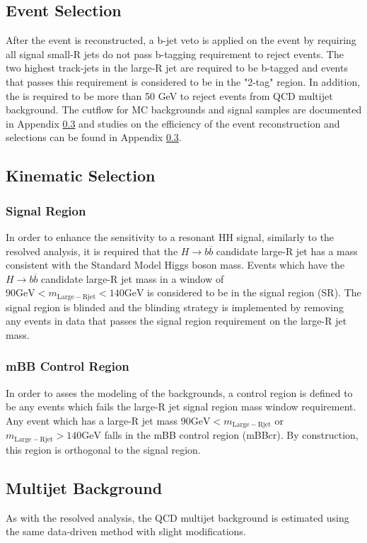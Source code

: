 \subsection{Event Selection}
After the event is reconstructed, a b-jet veto is applied on the event by requiring all signal small-R jets do not pass b-tagging requirement to reject \ttbar events. The two highest \pT track-jets in the large-R jet are required to be b-tagged and events that passes this requirement is considered to be in the "2-tag" region. In addition, the \met is required to be more than 50 GeV to reject events from QCD multijet background. The cutflow for MC backgrounds and signal samples are documented in Appendix \ref{} and studies on the efficiency of the event reconstruction and selections can be found in Appendix \ref{}.

\subsection{Kinematic Selection}
\subsubsection{Signal Region}
\label{sec:boosted_regiondefs}
In order to enhance the sensitivity to a resonant HH signal, similarly to the resolved analysis, it is required
that the ${H\rightarrow b\overline{b}}$ candidate large-R jet has a mass consistent with the Standard Model Higgs boson mass.
Events which have the ${H\rightarrow b\overline{b}}$ candidate large-R jet mass in a window of ${90 \mathrm{GeV} < m_{\mathrm{Large-R jet}} < 140 \mathrm{GeV}}$ is considered to be in the signal region (SR).
The signal region is blinded and the blinding strategy is implemented by removing any events in data that passes the signal region requirement on the large-R jet mass.

\subsubsection{mBB Control Region}
In order to asses the modeling of the backgrounds, a control region is defined to be any events which fails the large-R jet signal region mass window requirement. Any event which has a large-R jet mass
 ${90 \mathrm{GeV} < m_{\mathrm{Large-R jet}}}$
 or ${m_{\mathrm{Large-R jet}} > 140 \mathrm{GeV}}$ 
 falls in the mBB control region (mBBcr). By construction, this region is orthogonal to the signal region.

\subsection{Multijet Background}
As with the resolved analysis, the QCD multijet background is estimated using the same data-driven method with slight modifications. 
 
